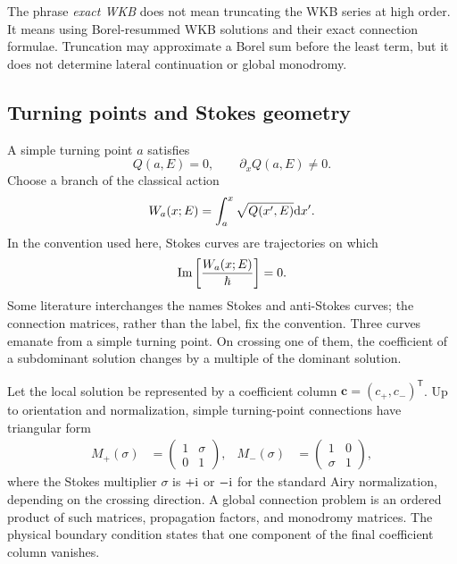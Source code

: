 The phrase \textit{exact WKB} does not mean truncating the WKB series at high
order.  It means using Borel-resummed WKB solutions and their exact connection
formulae.  Truncation may approximate a Borel sum before the least term, but it
does not determine lateral continuation or global monodromy.

\subsection{Turning points and Stokes geometry}
\label{subsec:stokes-geometry}

A simple turning point $a$ satisfies
\begin{equation}
  Q(a,E)=0,
  \qquad
  \partial_xQ(a,E)\ne0 .
  \label{eq:simple-turning-point}
\end{equation}
Choose a branch of the classical action
\begin{equation}
  W_a(x;E)=\int_a^x\sqrt{Q(x',E)}\mathrm{d} x' .
  \label{eq:classical-action}
\end{equation}
In the convention used here, Stokes curves are trajectories on which
\begin{equation}
  \operatorname{Im}\left[\frac{W_a(x;E)}{\hbar}\right]=0 .
  \label{eq:stokes-curve}
\end{equation}
Some literature interchanges the names Stokes and anti-Stokes curves; the
connection matrices, rather than the label, fix the convention.  Three curves
emanate from a simple turning point.  On crossing one of them, the coefficient
of a subdominant solution changes by a multiple of the dominant solution.

Let the local solution be represented by a coefficient column
$\bm c=(c_+,c_-)^{\mathsf T}$.  Up to orientation and normalization, simple
turning-point connections have triangular form
\begin{align}
  M_+(\sigma)&=
  \begin{pmatrix}1&\sigma\\0&1\end{pmatrix},
  &
  M_-(\sigma)&=
  \begin{pmatrix}1&0\\\sigma&1\end{pmatrix},
  \label{eq:stokes-matrices}
\end{align}
where the Stokes multiplier $\sigma$ is $+\mathrm{i}$ or $-\mathrm{i}$ for the standard
Airy normalization, depending on the crossing direction.  A global connection
problem is an ordered product of such matrices, propagation factors, and
monodromy matrices.  The physical boundary condition states that one component
of the final coefficient column vanishes.

